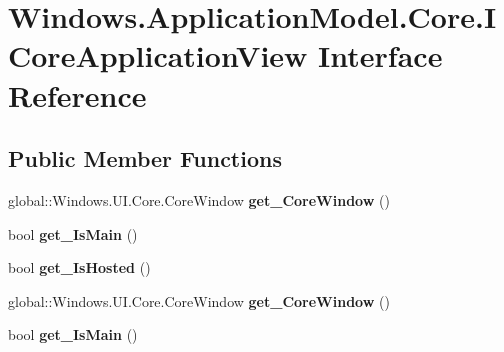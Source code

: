 \hypertarget{interface_windows_1_1_application_model_1_1_core_1_1_i_core_application_view}{}\section{Windows.\+Application\+Model.\+Core.\+I\+Core\+Application\+View Interface Reference}
\label{interface_windows_1_1_application_model_1_1_core_1_1_i_core_application_view}
\subsection*{Public Member Functions}
\begin{DoxyCompactItemize}
\item 
\mbox{\label{interface_windows_1_1_application_model_1_1_core_1_1_i_core_application_view_aad6fb5831943a0025b6253a517f2ac40}} 
global\+::\+Windows.\+U\+I.\+Core.\+Core\+Window {\bfseries get\+\_\+\+Core\+Window} ()
\item 
\mbox{\label{interface_windows_1_1_application_model_1_1_core_1_1_i_core_application_view_a74d261cd11b57aa6081977fb2a26c6bc}} 
bool {\bfseries get\+\_\+\+Is\+Main} ()
\item 
\mbox{\label{interface_windows_1_1_application_model_1_1_core_1_1_i_core_application_view_a703d9f7c90480a9a0d1f57d7b5332600}} 
bool {\bfseries get\+\_\+\+Is\+Hosted} ()
\item 
\mbox{\label{interface_windows_1_1_application_model_1_1_core_1_1_i_core_application_view_aad6fb5831943a0025b6253a517f2ac40}} 
global\+::\+Windows.\+U\+I.\+Core.\+Core\+Window {\bfseries get\+\_\+\+Core\+Window} ()
\item 
\mbox{\label{interface_windows_1_1_application_model_1_1_core_1_1_i_core_application_view_a74d261cd11b57aa6081977fb2a26c6bc}} 
bool {\bfseries get\+\_\+\+Is\+Main} ()

\end{DoxyCompactItemize}
